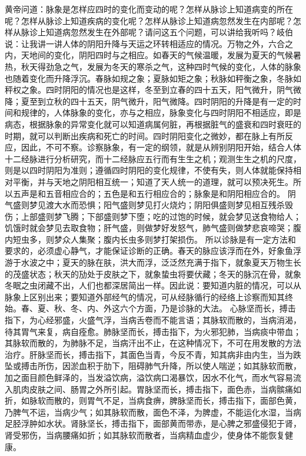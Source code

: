 \documentclass[a4paper,12pt,UTF8,twoside]{ctexbook}
\begin{document}
黄帝问道：脉象是怎样应四时的变化而变动的呢？怎样从脉诊上知道病变的所在呢？怎样从脉诊上知道疾病的变化呢？怎样从脉诊上知道病忽然发生在内部呢？怎样从脉诊上知道病忽然发生在外部呢？请问这五个问题，可以讲给我听吗？岐伯说：让我讲一讲人体的阴阳升降与天运之环转相适应的情况。万物之外，六合之内，天地间的变化，阴阳四时与之相应。如春天的气候温暖，发展为夏天的气候暑热，秋天得劲急之气，发展为冬天的寒杀之气，这种四时气候的变化，人体的脉象也随着变化而升降浮沉。春脉如规之象；夏脉如矩之象；秋脉如秤衡之象，冬脉如秤权之象。四时阴阳的情况也是这样，冬至到立春的四十五天，阳气微升，阴气微降；夏至到立秋的四十五天，阴气微升，阳气微降。四时阴阳的升降是有一定的时间和规律的，人体脉象的变化，亦与之相应，脉象变化与四时阴阳不相适应，即是病态，根据脉象的异常变化就可以知道病属何脏，再根据脏气的盛衰和四时衰旺的时期，就可以判断出疾病和死亡的时间。四时阴阳变化之微妙，都在脉上有所反应，因此，不可不察。诊察脉象，有一定的纲领，就是从辨别阴阳开始，结合人体十二经脉进行分析研究，而十二经脉应五行而有生生之机；观测生生之机的尺度，则是以四时阴阳为准则；遵循四时阴阳的变化规律，不使有失，则人体就能保持相对平衡，并与天地之阴阳相互统一；知道了天人统一的道理，就可以预决死生。所以五声是和五音相应合的；五色是和五行相应合的；脉象是和阴阳相应合的。
阴气盛则梦见渡大水而恐惧；阳气盛则梦见打火烧灼；阴阳俱盛则梦见相互残杀毁伤；上部盛则梦飞腾；下部盛则梦下堕；吃的过饱的时候，就会梦见送食物给人；饥饿时就会梦见去取食物；肝气盛，则做梦好发怒气，肺气盛则做梦悲哀啼哭；腹内短虫多，则梦众人集聚；腹内长虫多则梦打架损伤。
所以诊脉是有一定方法和要求的，必须虚心静气，才能保证诊断的正确。春天的脉应该浮而在外，好象鱼浮游于水波之中；夏天的脉在肤，洪大而浮，泛泛然充满于指下，就象夏天万物生长的茂盛状态；秋天的劢处于皮肤之下，就象蛰虫将要伏藏；冬天的脉沉在骨，就象冬眠之虫闭藏不出，人们也都深居简出一样。因此说：要知道内脏的情况，可以从脉象上区别出来；要知道外部经气的情况，可从经脉循行的经络上诊察而知其终始。春、夏、秋、冬、内、外这六个方面，乃是诊脉的大法。
心脉坚而长，搏击指下，为心经邪盛，火盛气浮，当病舌卷而不能言语；其脉软而散的，当病消渴，待其胃气来复，病自痊愈。肺脉坚而长，搏击指下，为火邪犯肺，当病痰中带血；其脉软而散的，为肺脉不足，当病汗出不止，在这种情况下，不可在用发散的方法治疗。肝脉坚而长，搏击指下，其面色当青，今反不青，知其病非由内生，当为跌坠或搏击所伤，因淤血积于肋下，阻碍肺气升降，所以使人喘逆；如其脉软而散，加之面目颜色鲜泽的，当发溢饮病，溢饮病口渴暴饮，因水不化气，而水气容易流入肌肉皮肤之间、肠胃之外所引起。胃脉坚而长，搏击指下，面色赤，当病髌痛如折，如脉软而散的，则胃气不足，当病食痹，脾脉坚而长，搏击指下，面部色黄，乃脾气不运，当病少气；如其脉软而散，面色不泽，为脾虚，不能运化水湿，当病足胫浮肿如水状。肾脉坚长，搏击指下，面部黄而带赤，是心脾之邪盛侵犯于肾，肾受邪伤，当病腰痛如折；如其脉软而散者，当病精血虚少，使身体不能恢复健康。
\end{document}
